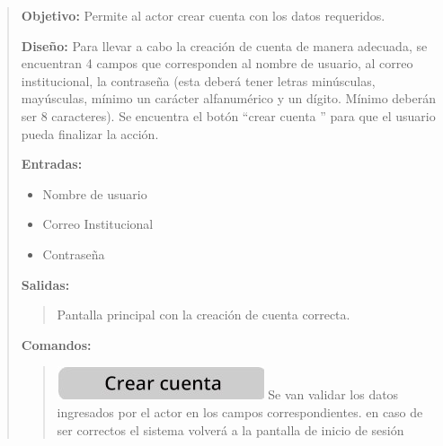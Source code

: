 \documentclass[14pt]{article}
\begin{document}
                \begin{quote}
                    \textbf{Objetivo:} Permite al actor crear cuenta con los datos requeridos.
            
                    \textbf{Diseño:} Para llevar a cabo la creación de cuenta de manera adecuada, se encuentran 4 campos que corresponden al nombre de usuario, al correo institucional, la contraseña (esta deberá tener letras minúsculas, mayúsculas, mínimo un carácter alfanumérico  y un dígito. Mínimo deberán ser 8 caracteres). Se encuentra el botón “crear cuenta ”   para que el usuario pueda finalizar la acción.
                    
                    \textbf{Entradas:} 
                        \begin{itemize}
                            \item Nombre de usuario
                            \item Correo Institucional
                            \item Contraseña
                        \end{itemize}
                    
                    \textbf{Salidas:}
                        \begin{quote}
                            Pantalla principal con la creación de cuenta correcta.
                        \end{quote}
                        
                    \textbf{Comandos:}
                        \begin{quote}
                            \includegraphics[height=0.02\textwidth]{BotonCrearCuenta.jpg}
                            \label{P1:BotonCrearCuenta}
                            Se van validar los datos ingresados por el actor en los campos correspondientes. en caso de ser correctos el sistema volverá  a la pantalla de inicio de sesión 
                        \end{quote}
                \end{quote}
            
            \newpage
\end{document}

